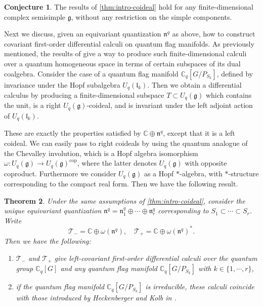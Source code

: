 \documentclass[a4paper, 12pt, reqno, english]{amsart}
\numberwithin{equation}{section}
\numberwithin{figure}{section}
\theoremstyle{plain}
\newtheorem{theorem}{Theorem}[section]
\theoremstyle{plain}
\theoremstyle{plain}
\theoremstyle{plain}
\theoremstyle{plain}
\theoremstyle{definition}
\theoremstyle{definition}
\theoremstyle{definition}
\theoremstyle{remark}
\theoremstyle{definition}
\theoremstyle{definition}
\newtheorem{conjecture}[theorem]{Conjecture}
\newcommand{\Uqg}{U_q(\mathfrak{g})}
\newcommand{\Uqlk}{U_q(\mathfrak{l}_k)}
\newcommand{\CqG}{\mathbb{C}_q[G]}
\newcommand{\bbC}{\mathbb{C}}
\newcommand{\lieg}{\mathfrak{g}}
\newcommand{\lien}{\mathfrak{n}}
\newcommand{\qnil}{\lien^q}
\newcommand{\Cq}{\mathbb{C}_q}
\newcommand{\tang}{\mathcal{T}}
\begin{document}
\begin{conjecture}
The results of \cref{thm:intro-coideal} hold for any finite-dimensional complex semisimple $\lieg$, without any restriction on the simple components.
\end{conjecture}

Next we discuss, given an equivariant quantization $\qnil$ as above, how to construct covariant first-order differential calculi on quantum flag manifolds.
As previously mentioned, the results of \cite{heko-homogeneous} give a way to produce such finite-dimensional calculi over a quantum homogeneous space in terms of certain subspaces of its dual coalgebra.
Consider the case of a quantum flag manifold $\Cq[G / P_{S_k}]$, defined by invariance under the Hopf subalgebra $\Uqlk$.
Then we obtain a differential calculus by producing a finite-dimensional subspace $T \subset \Uqg$ which contains the unit, is a right $\Uqg$-coideal, and is invariant under the left adjoint action of $\Uqlk$.

These are exactly the properties satisfied by $\bbC \oplus \qnil$, except that it is a left coideal.
We can easily pass to right coideals by using the quantum analogue of the Chevalley involution, which is a Hopf algebra isomorphism $\omega: \Uqg \to \Uqg^{\mathrm{cop}}$, where the latter denotes $\Uqg$ with opposite coproduct.
Furthermore we consider $\Uqg$ as a Hopf $*$-algebra, with $*$-structure corresponding to the compact real form.
Then we have the following result.

\begin{theorem}
\label{thm:intro-calculi}
Under the same assumptions of \cref{thm:intro-coideal}, consider the unique equivariant quantization $\qnil = \qnil_1 \oplus \cdots \oplus \qnil_r$ corresponding to $S_1 \subset \cdots \subset S_r$. Write
\[
\tang_- = \bbC \oplus \omega(\qnil), \quad
\tang_+ = \bbC \oplus \omega(\qnil)^*.
\]
Then we have the following:
\begin{enumerate}
\item $\tang_-$ and $\tang_+$ give left-covariant first-order differential calculi over the quantum group $\CqG$ and any quantum flag manifold $\Cq[G / P_{S_k}]$ with $k \in \{ 1, \cdots, r \}$,
\item if the quantum flag manifold $\Cq[G / P_{S_k}]$ is irreducible, these calculi coincide with those introduced by Heckenberger and Kolb in \cite{heko}.
\end{enumerate}
\end{theorem}
\end{document}

